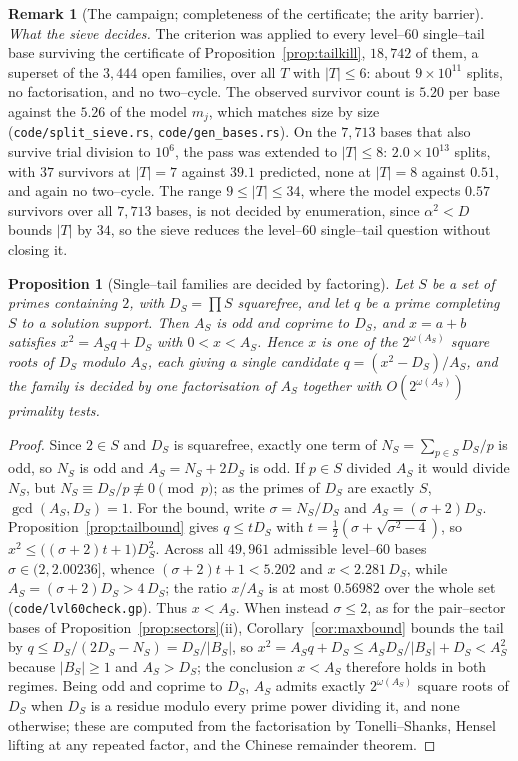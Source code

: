 \documentclass[11pt]{article}
\newtheorem{proposition}[theorem]{Proposition}
\theoremstyle{definition}
\newtheorem{remark}[theorem]{Remark}
\begin{document}
\begin{remark}[The campaign; completeness of the certificate; the arity barrier]
\emph{What the sieve decides.} The criterion was applied to every level--$60$ single--tail base surviving the certificate of
Proposition~\ref{prop:tailkill}, $18{,}742$ of them, a superset of the $3{,}444$ open families, over
all $T$ with $|T|\le6$: about $9\times10^{11}$ splits, no factorisation, and no two--cycle. The
observed survivor count is $5.20$ per base against the $5.26$ of the model $m_j$, which matches size by size
\textup{(\texttt{code/split\_sieve.rs}, \texttt{code/gen\_bases.rs})}. On the $7{,}713$ bases that also
survive trial division to $10^{6}$, the pass was extended to $|T|\le8$: $2.0\times10^{13}$ splits,
with $37$ survivors at $|T|=7$ against $39.1$ predicted, none at $|T|=8$ against $0.51$, and again no two--cycle. The range
$9\le|T|\le34$, where the model expects $0.57$ survivors over all $7{,}713$ bases, is not decided by enumeration, since
$\alpha^{2}<D$ bounds $|T|$ by $34$, so the sieve reduces the level--$60$ single--tail question without closing it.


\begin{proposition}[Single--tail families are decided by factoring]\label{prop:lvl60factor}
Let $S$ be a set of primes containing $2$, with $D_S=\prod S$ squarefree, and let $q$ be a prime
completing $S$ to a solution support. Then $A_S$ is odd and coprime to $D_S$, and $x=a+b$ satisfies
$x^2=A_Sq+D_S$ with $0<x<A_S$. Hence $x$ is one of the $2^{\omega(A_S)}$ square roots of $D_S$ modulo
$A_S$, each giving a single candidate $q=(x^2-D_S)/A_S$, and the family is decided by one
factorisation of $A_S$ together with $O(2^{\omega(A_S)})$ primality tests.
\end{proposition}
\begin{proof}
Since $2\in S$ and $D_S$ is squarefree, exactly one term of $N_S=\sum_{p\in S}D_S/p$ is odd, so $N_S$ is
odd and $A_S=N_S+2D_S$ is odd. If $p\in S$ divided $A_S$ it would divide $N_S$, but $N_S\equiv D_S/p
\not\equiv0\pmod p$; as the primes of $D_S$ are exactly $S$, $\gcd(A_S,D_S)=1$. For the bound, write
$\sigma=N_S/D_S$ and $A_S=(\sigma+2)D_S$. Proposition~\ref{prop:tailbound} gives $q\le tD_S$ with
$t=\tfrac12(\sigma+\sqrt{\sigma^2-4})$, so $x^2\le\bigl((\sigma+2)t+1\bigr)D_S^2$. Across all
$49{,}961$ admissible level--$60$ bases $\sigma\in(2,2.00236]$, whence $(\sigma+2)t+1<5.202$ and
$x<2.281\,D_S$, while $A_S=(\sigma+2)D_S>4\,D_S$; the ratio $x/A_S$ is at most $0.56982$ over the whole
set \textup{(\texttt{code/lvl60check.gp})}. Thus $x<A_S$. When instead $\sigma\le2$, as for the
pair--sector bases of Proposition~\ref{prop:sectors}(ii), Corollary~\ref{cor:maxbound} bounds the tail
by $q\le D_S/(2D_S-N_S)=D_S/|B_S|$, so $x^2=A_Sq+D_S\le A_SD_S/|B_S|+D_S<A_S^2$ because $|B_S|\ge1$ and
$A_S>D_S$; the conclusion $x<A_S$ therefore holds in both regimes. Being odd and coprime to $D_S$,
$A_S$ admits exactly $2^{\omega(A_S)}$ square roots of $D_S$ when $D_S$ is a residue modulo every prime
power dividing it, and none otherwise; these are computed from the factorisation by Tonelli--Shanks,
Hensel lifting at any repeated factor, and the Chinese remainder theorem.
\end{proof}


\end{remark}
\end{document}
